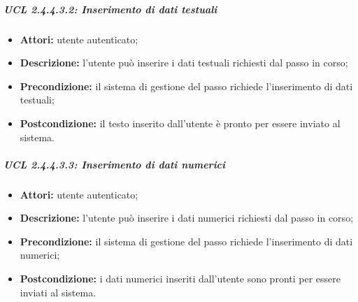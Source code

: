 \subparagraph{UCL 2.4.4.3.2: Inserimento di dati testuali}
\begin{itemize}
\item \textbf{Attori:} utente autenticato;
\item \textbf{Descrizione:} l'utente può inserire i dati testuali richiesti dal passo in corso;
\item \textbf{Precondizione:} il sistema di gestione del passo richiede l'inserimento di dati testuali;
\item \textbf{Postcondizione:} il testo inserito dall'utente è pronto per essere inviato al sistema.
\end{itemize}

\subparagraph{UCL 2.4.4.3.3: Inserimento di dati numerici}
\begin{itemize}
\item \textbf{Attori:} utente autenticato;
\item \textbf{Descrizione:} l'utente può inserire i dati numerici richiesti dal passo in corso;
\item \textbf{Precondizione:} il sistema di gestione del passo richiede l'inserimento di dati numerici;
\item \textbf{Postcondizione:} i dati numerici inseriti dall'utente sono pronti per essere inviati al sistema.
\end{itemize}

